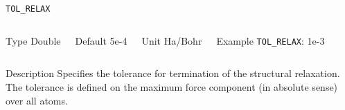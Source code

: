 \documentclass[xcolor=dvipsnames,t]{beamer}
\begin{document}
\begin{frame}[allowframebreaks]{\texttt{TOL\_RELAX}} \label{TOL_RELAX}
\vspace*{-12pt}
\begin{columns}
\begin{block}{Type}
Double
\end{block}

\begin{block}{Default}
5e-4
\end{block}

\begin{block}{Unit}
Ha/Bohr
\end{block}

\begin{block}{Example}
\texttt{TOL\_RELAX}: 1e-3
\end{block}
\end{columns}

\begin{block}{Description}
Specifies the tolerance for termination of the structural relaxation. The tolerance is defined on the maximum force component (in absolute sense) over all atoms. 
\end{block}


\end{frame}
\end{document}
